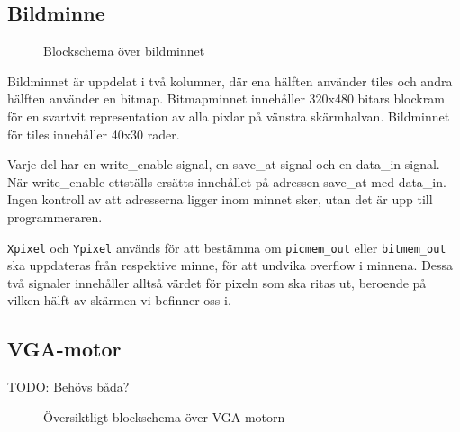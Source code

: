 \documentclass[]{article}
\begin{document}
\subsection{Bildminne}
\begin{figure}[h!]
	\caption{Blockschema över bildminnet}
\end{figure}

Bildminnet är uppdelat i två kolumner, där ena hälften använder tiles och andra hälften använder en bitmap. Bitmapminnet innehåller 320x480 bitars blockram för en svartvit representation av alla pixlar på vänstra skärmhalvan. Bildminnet för tiles innehåller 40x30 rader.

Varje del har en write\_enable-signal, en save\_at-signal och en data\_in-signal. När write\_enable ettställs ersätts innehållet på adressen save\_at med data\_in. Ingen kontroll av att adresserna ligger inom minnet sker, utan det är upp till programmeraren.

\label{parag:picmempixel}
\texttt{Xpixel} och \texttt{Ypixel} används för att bestämma om \texttt{picmem\_out} eller \texttt{bitmem\_out} ska uppdateras från respektive minne, för att undvika overflow i minnena. Dessa två signaler innehåller alltså värdet för pixeln som ska ritas ut, beroende på vilken hälft av skärmen vi befinner oss i.

\subsection{VGA-motor}
TODO: Behövs båda?
\begin{figure}[h!]
	\caption{Översiktligt blockschema över VGA-motorn}
\end{figure}
\end{document}
